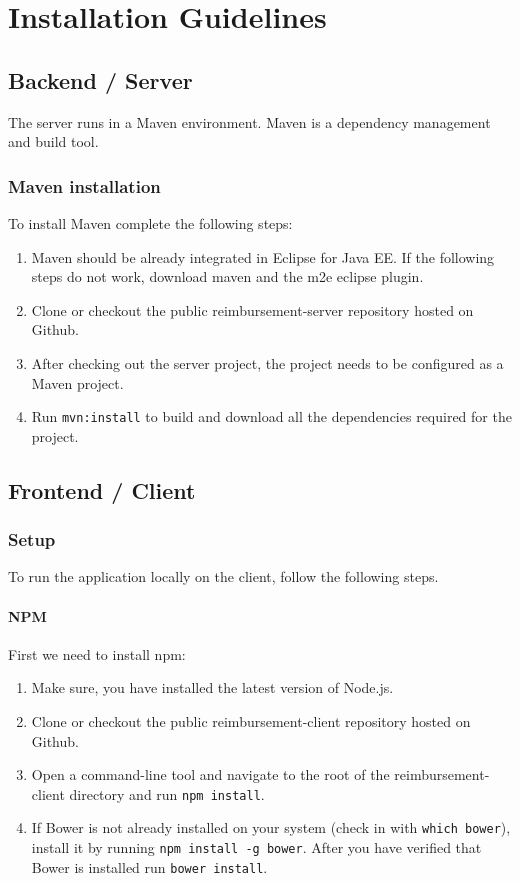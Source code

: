 \appendix

\chapter{Installation Guidelines}

\section{Backend / Server}

The server runs in a Maven environment. Maven is a dependency management and build tool.

\subsection{Maven installation}
To install Maven complete the following steps:

\begin{enumerate}
    \item Maven should be already integrated in Eclipse for Java EE. If the following steps do not work, download maven and the m2e eclipse plugin.
    \item Clone or checkout the public reimbursement-server repository hosted on Github.
    \item After checking out the server project, the project needs to be configured as a Maven project.
    \item Run \texttt{mvn:install} to build and download all the dependencies required for the project. 
\end{enumerate}


\section{Frontend / Client}

\subsection{Setup}
To run the application locally on the client, follow the following steps.

\subsubsection{NPM}
First we need to install npm:
\begin{enumerate}
  \item Make sure, you have installed the latest version of Node.js.
  \item Clone or checkout the public reimbursement-client repository hosted on Github.
  \item Open a command-line tool and navigate to the root of the reimbursement-client directory and run \texttt{npm install}.
  \item If Bower is not already installed on your system (check in with \texttt{which bower}), install it by running \texttt{npm install -g bower}. After you have verified that Bower is installed run \texttt{bower install}.
\end{enumerate}

